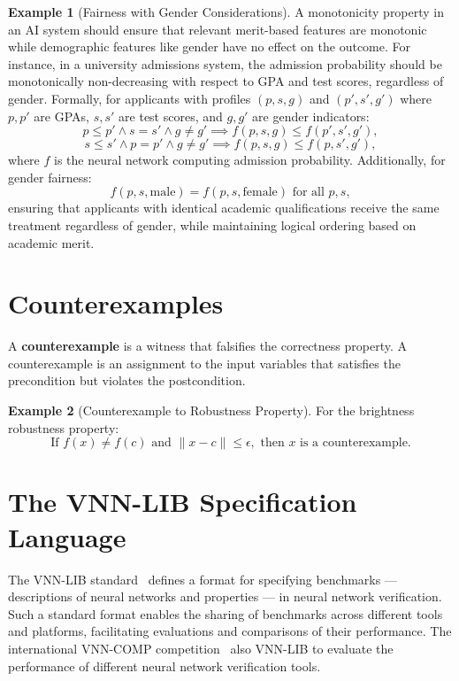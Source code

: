 \documentclass[oneside,11pt,dvipsnames]{book}
\numberwithin{equation}{section}
\theoremstyle{definition}
\newtheorem{example}{Example}[section]
\theoremstyle{remark}
\begin{document}
\begin{example}[Fairness with Gender Considerations]
    A monotonicity property in an AI system should ensure that relevant merit-based features are monotonic while demographic features like gender have no effect on the outcome. For instance, in a university admissions system, the admission probability should be monotonically non-decreasing with respect to GPA and test scores, regardless of gender. Formally, for applicants with profiles $(p, s, g)$ and $(p', s', g')$ where $p, p'$ are GPAs, $s, s'$ are test scores, and $g, g'$ are gender indicators:
\[
p \leq p' \land s = s' \land g \neq g' \implies f(p, s, g) \leq f(p', s', g'),
\]
\[
s \leq s' \land p = p' \land g \neq g' \implies f(p, s, g) \leq f(p, s', g'),
\]
where $f$ is the neural network computing admission probability. Additionally, for gender fairness:
\[
f(p, s, \text{male}) = f(p, s, \text{female}) \text{ for all } p, s,
\]
ensuring that applicants with identical academic qualifications receive the same treatment regardless of gender, while maintaining logical ordering based on academic merit.
\end{example}



\section{Counterexamples}\label{sec:counterexamples}

A \textbf{counterexample} is a witness that falsifies the correctness property. A counterexample is an assignment to the input variables that satisfies the precondition but violates the postcondition.

\begin{example}[Counterexample to Robustness Property]
For the brightness robustness property:
\[
\text{If } f(x) \neq f(c) \text{ and } \|x - c\| \leq \epsilon, \text{ then } x \text{ is a counterexample.}
\]
\end{example}


\section{The VNN-LIB  Specification Language}


The VNN-LIB standard~\cite{demarchi2023supporting,vnnlib} defines a format for specifying benchmarks --- descriptions of neural networks and properties --- in neural network verification. Such a standard format enables the sharing of benchmarks across different tools and platforms, facilitating evaluations and comparisons of their performance. The international VNN-COMP competition~\cite{brix2024fifth} also VNN-LIB to evaluate the performance of different neural network verification tools.
\end{document}
